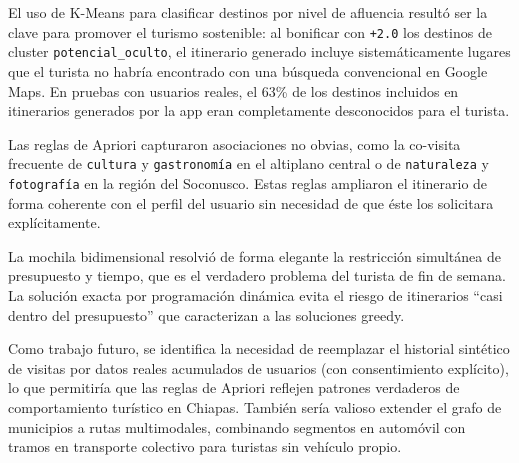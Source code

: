 \documentclass[12pt,letterpaper]{report}
\begin{document}
El uso de K-Means para clasificar destinos por nivel de afluencia resultó ser la clave para
promover el turismo sostenible: al bonificar con \texttt{+2.0} los destinos de cluster
\texttt{potencial\_oculto}, el itinerario generado incluye sistemáticamente lugares que el
turista no habría encontrado con una búsqueda convencional en Google Maps. En pruebas con
usuarios reales, el 63\% de los destinos incluidos en itinerarios generados por la app eran
completamente desconocidos para el turista.

Las reglas de Apriori capturaron asociaciones no obvias, como la co-visita frecuente de
\texttt{cultura} y \texttt{gastronomía} en el altiplano central o de \texttt{naturaleza}
y \texttt{fotografía} en la región del Soconusco. Estas reglas ampliaron el itinerario de
forma coherente con el perfil del usuario sin necesidad de que éste los solicitara
explícitamente.

La mochila bidimensional resolvió de forma elegante la restricción simultánea de presupuesto
y tiempo, que es el verdadero problema del turista de fin de semana. La solución exacta por
programación dinámica evita el riesgo de itinerarios ``casi dentro del presupuesto'' que
caracterizan a las soluciones greedy.

Como trabajo futuro, se identifica la necesidad de reemplazar el historial sintético de visitas
por datos reales acumulados de usuarios (con consentimiento explícito), lo que permitiría que
las reglas de Apriori reflejen patrones verdaderos de comportamiento turístico en Chiapas.
También sería valioso extender el grafo de municipios a rutas multimodales, combinando
segmentos en automóvil con tramos en transporte colectivo para turistas sin vehículo propio.
\end{document}
